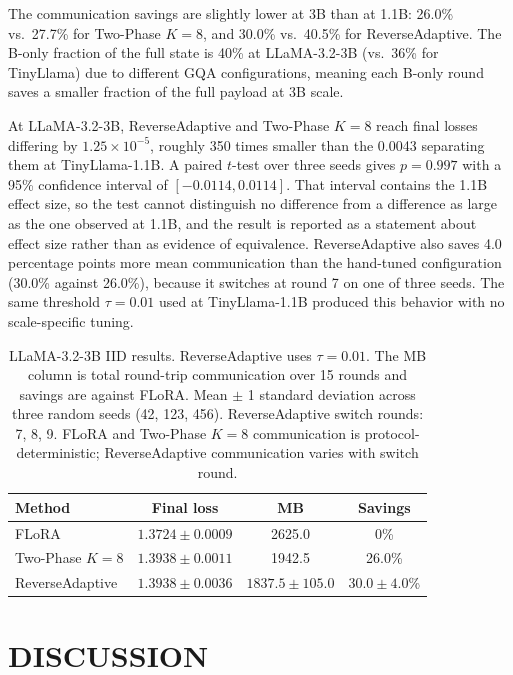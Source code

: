 The communication savings are slightly lower at 3B than at 1.1B: 26.0\% vs.\ 27.7\% for Two-Phase $K{=}8$, and 30.0\% vs.\ 40.5\% for ReverseAdaptive. The B-only fraction of the full state is 40\% at LLaMA-3.2-3B (vs.\ 36\% for TinyLlama) due to different GQA configurations, meaning each B-only round saves a smaller fraction of the full payload at 3B scale.

At LLaMA-3.2-3B, ReverseAdaptive and Two-Phase $K{=}8$ reach final losses differing by $1.25 \times 10^{-5}$, roughly 350 times smaller than the 0.0043 separating them at TinyLlama-1.1B. A paired $t$-test over three seeds gives $p = 0.997$ with a 95\% confidence interval of $[-0.0114, 0.0114]$. That interval contains the 1.1B effect size, so the test cannot distinguish no difference from a difference as large as the one observed at 1.1B, and the result is reported as a statement about effect size rather than as evidence of equivalence. ReverseAdaptive also saves 4.0 percentage points more mean communication than the hand-tuned configuration (30.0\% against 26.0\%), because it switches at round 7 on one of three seeds. The same threshold $\tau{=}0.01$ used at TinyLlama-1.1B produced this behavior with no scale-specific tuning.

\begin{table}[t]
\caption{LLaMA-3.2-3B IID results. ReverseAdaptive uses $\tau{=}0.01$. The MB column is total round-trip communication over 15 rounds and savings are against FLoRA. Mean $\pm$ 1 standard deviation across three random seeds (42, 123, 456). ReverseAdaptive switch rounds: 7, 8, 9. FLoRA and Two-Phase $K{=}8$ communication is protocol-deterministic; ReverseAdaptive communication varies with switch round.}
\label{tab:llama_iid}
\begin{center}
\footnotesize
\setlength{\tabcolsep}{2pt}
\begin{tabular}{@{}lccc@{}}
\toprule
Method & Final loss & MB & Savings \\
\midrule
FLoRA & $1.3724 \pm 0.0009$ & 2625.0 & 0\% \\
Two-Phase $K{=}8$ & $1.3938 \pm 0.0011$ & 1942.5 & 26.0\% \\
ReverseAdaptive & $1.3938 \pm 0.0036$ & $1837.5 \pm 105.0$ & $30.0 \pm 4.0$\% \\
\bottomrule
\end{tabular}
\end{center}
\end{table}

\section{DISCUSSION}
\label{sec:discussion}

